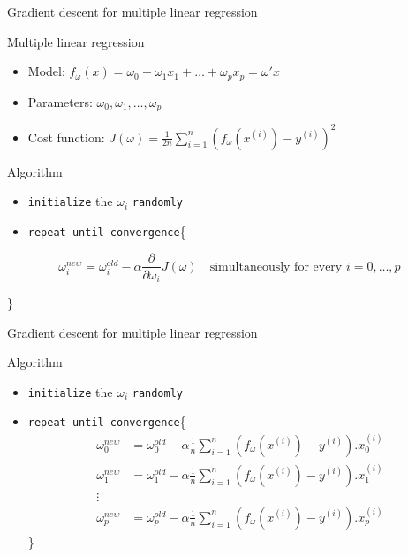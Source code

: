 \documentclass[
  9pt,
  ignorenonframetext,
  aspectratio=169,
  t, dvipsnames]{beamer}
\providecommand{\tightlist}{%
  \setlength{\itemsep}{0pt}\setlength{\parskip}{0pt}}\usepackage{longtable,booktabs,array}
\theoremstyle{definition}
\begin{document}
\begin{frame}[fragile]{Gradient descent for multiple linear regression}
\protect\hypertarget{gradient-descent-for-multiple-linear-regression}{}
\begin{block}{Multiple linear regression}

\begin{itemize}
\tightlist
\item
  Model:
  \(f_{\omega}(x) = \omega_0 + \omega_1 x_1 + \ldots + \omega_p x_p= \omega'x\)
\item
  Parameters: \(\omega_0, \omega_1, \ldots, \omega_p\)
\item
  Cost function:
  \(J(\omega) = \frac{1}{2 n} \sum_{i=1}^{n}\left(f_{\omega}\left(x^{(i)}\right)-y^{(i)}\right)^{2}\)
\end{itemize}

\end{block}

\begin{alertblock}{Algorithm}

\begin{itemize}
\tightlist
\item
  \texttt{initialize} the \(\omega_i\) \texttt{randomly}
\item
  \texttt{repeat\ until\ convergence}\{
\end{itemize}

\[\omega_i^{new} = \omega_i^{old} - \alpha \frac{\partial }{\partial \omega_i} J(\omega) \quad \text{simultaneously for every } i=0,\ldots,p\]

\}

\end{alertblock}
\end{frame}

\begin{frame}[fragile]{Gradient descent for multiple linear regression}
\protect\hypertarget{gradient-descent-for-multiple-linear-regression-1}{}
\begin{alertblock}{Algorithm}

\begin{itemize}
\tightlist
\item
  \texttt{initialize} the \(\omega_i\) \texttt{randomly}
\item
  \texttt{repeat\ until\ convergence}\{ \begin{align*}
  \omega_0^{new} &= \omega_0^{old} - \alpha \frac{1}{n} \sum_{i=1}^{n}\left(f_{\omega}\left(x^{(i)}\right)-y^{(i)}\right).x_0^{(i)} \\
  \omega_1^{new} &= \omega_1^{old} - \alpha \frac{1}{n} \sum_{i=1}^{n}\left(f_{\omega}\left(x^{(i)}\right)-y^{(i)}\right).x_1^{(i)} \\
  \vdots \\
  \omega_p^{new} &= \omega_p^{old} - \alpha \frac{1}{n} \sum_{i=1}^{n}\left(f_{\omega}\left(x^{(i)}\right)-y^{(i)}\right).x_p^{(i)}
  \end{align*} \}
\end{itemize}

\end{alertblock}
\end{frame}
\end{document}
